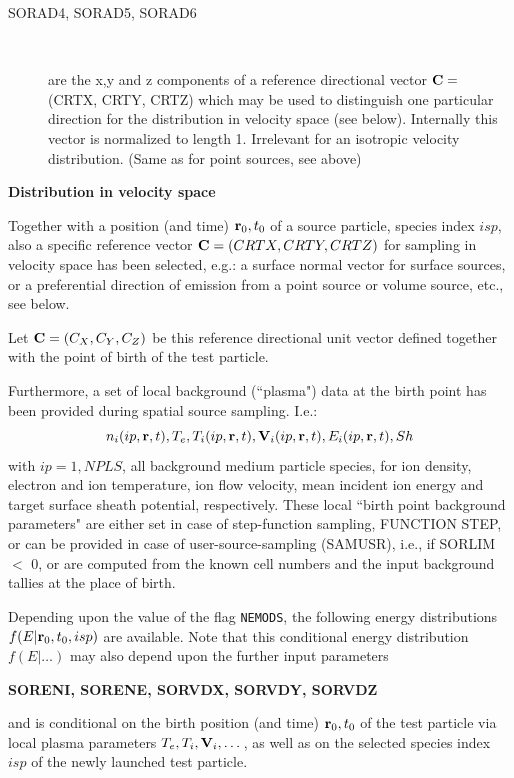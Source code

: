 \begin{description}
  \item[SORAD4, SORAD5, SORAD6] ~ 

        are the x,y and z components of a reference directional vector $\mathbf{C} =$ (CRTX,
        CRTY, CRTZ) which may be used to distinguish one particular direction for the
        distribution in velocity space (see below).
        Internally this vector is normalized to length 1.
        Irrelevant for an isotropic velocity distribution.
        (Same as for point sources, see above) \
\end{description}

\medskip 

\textbf{Distribution in velocity space} 

\medskip 

Together with a position (and time) $\mathbf{r}_0,t_0$ of a source particle, species
index $isp$,  also a specific reference vector $\mathbf{C} = (CRTX,CRTY,CRTZ)$ for
sampling in velocity space has been selected, e.g.: a surface normal vector for
surface sources, or a preferential direction of emission from a point source or
volume source, etc., see below.

Let $\mathbf{C} = (C_X,C_Y,C_Z)$ be this reference directional unit vector defined
together with the point of birth of the test particle.

Furthermore, a set of local background (``plasma") data at the birth point has
been provided during spatial source sampling.
I.e.:
\begin{equation}
  \label{local-source}
  n_i(ip,\mathbf{r},t), T_e, T_i(ip,\mathbf{r},t), \mathbf{V}_i(ip,\mathbf{r},t), E_i(ip,\mathbf{r},t), Sh
\end{equation}
with $ip=1, NPLS$, all background medium particle species,
for ion density, electron and ion temperature,
ion flow velocity, mean incident ion energy
and target surface sheath potential,
respectively.
These local ``birth point background parameters" are either set in case of
step-function sampling, FUNCTION STEP, or can be provided in case of
user-source-sampling (SAMUSR), i.e., if  SORLIM $<$ 0, or are computed from the
known cell numbers and the input background tallies at the place of birth.

Depending upon the value of the flag \lstinline|NEMODS|, the following
energy distributions $f(E|\mathbf{r}_0, t_0, isp)$ are available.
Note that this conditional energy distribution $f(E|\dots)$ may also depend
upon the further input parameters 

\textbf{SORENI, SORENE, SORVDX, SORVDY, SORVDZ} 

and is conditional on the birth position (and time) $\mathbf{r}_0,t_0$ of the test
particle via local plasma parameters $T_e, T_i, \mathbf{V}_i, \dots$, as well as on
the selected species index $isp$ of the newly launched test particle.

